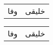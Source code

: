 \documentclass{article}
\begin{document}
\begin{tabular}{rr}
وفا & خلیقی
\end{tabular}
\setLTRtable
\begin{tabular}{rr}
وفا & خلیقی
\end{tabular}
\end{document}
